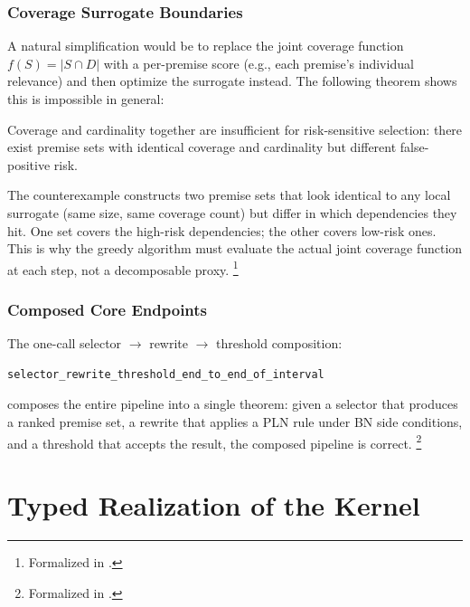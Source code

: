 \documentclass[11pt,openany]{report}
\begin{document}
\section{Coverage Surrogate Boundaries}

A natural simplification would be to replace the joint coverage function
$f(S) = |S \cap D|$ with a per-premise score (e.g., each premise's
individual relevance) and then optimize the surrogate instead.  The
following theorem shows this is impossible in general:

\boundarystart
\begin{theorem}
Coverage and cardinality together are insufficient for risk-sensitive
selection: there exist premise sets with identical coverage and cardinality
but different false-positive risk.
\end{theorem}
\boundaryend

\noindent
The counterexample constructs two premise sets that look identical to any
local surrogate (same size, same coverage count) but differ in which
dependencies they hit.  One set covers the high-risk dependencies; the
other covers low-risk ones.  This is why the greedy algorithm must
evaluate the actual joint coverage function at each step, not a
decomposable proxy.%
\footnote{Formalized in .}

\section{Composed Core Endpoints}

The one-call selector $\to$ rewrite $\to$ threshold composition:
\begin{lstlisting}
selector_rewrite_threshold_end_to_end_of_interval
\end{lstlisting}

composes the entire pipeline into a single theorem: given a selector that
produces a ranked premise set, a rewrite that applies a PLN rule under
BN side conditions, and a threshold that accepts the result, the composed
pipeline is correct.%
\footnote{Formalized in .}


\part{Typed Realization of the Kernel}
\label{part:ntt}
\end{document}
